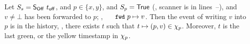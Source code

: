 \begin{comment}
\begin{proposition}[First Forwarding Principle]\label{inv:fwd1}%
If the scanner state is $\sss = \sOff\ \toff, \spp = \TT$, then
$\forall\ t \in \histp\ldot\ t \leq \E(t)< \toff \implies \C(t)=
\mathsf{green}$.
\end{proposition}
%
The above is our mathematical formulation approximating the
equally-named, but only informally stated property of
Jayanti~\cite{Jayanti:STOC05}, which says that if \jyscan~misses the
value of a concurrent write in lines~lineScanReadsY
and/or~\lineScanReadsY of Figure~\ref{fig:jayanti-snapshot}, but the
write finishes before the scanner goes through line~\lineScanUnsetsS
(the linearization point of \jyscan), then the scanner will catch the
value in by reading from the forwarding pointer in
lines~\lineScanReadsFX and/or \lineScanReadsFY. In our setting, this
is captured by saying that a write event that finished before $\toff$,
is green. The write event may have been yellow in the past, but the
act of forwarding will paint it green. We will see in
Section~\ref{sc:implementation} that auxiliary code for forwarding
will do just that.


Conversely, Jayanti's Second Principle states that any non-$\bot$
value read in lines~\lineScanReadsX and/or~\lineScanReadsY comes from
a write event that is concurrent with the scan. Moreover, any later
write to the same pointer will finish after the linearization point of
\jyscan~in line~\lineScanUnsetsS, and hence will be missed by the
scanner. While we do not formally capture exactly this property, we
approximate it with the following two invariants, which are
sufficient.

\end{comment}

\begin{invariant}\label{inv:readFP}%
Let $S_s= \mathsf{S_{Off}}\ t_{\mathsf{off}}$, and $p \in \{x, y\}$, and $S_p = \mathsf{True}$ (\ie,
scanner is in lines~\lineScanReadsFX--\lineScanChoosesRY), and $v \neq
\bot$ has been forwarded to $p$; \ie, $\aleksfwdp{p} \hpts v$. Then
the event of writing $v$ into $p$ is in the history, \ie, there exists
$t$ such that $t \mapsto (p, v) \in \chi_p$. Moreover, $t$ is the last
green, or the yellow timestamp in $\chi_p$.
\end{invariant}

